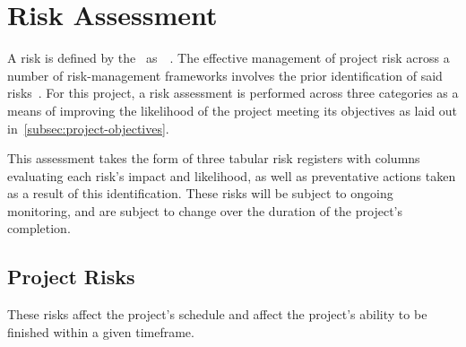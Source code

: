 
\thispagestyle{plain}
\newpage
\section{Risk Assessment}\label{sec:risk-assessment}

\normalsize

A risk is defined by the~\citet{pmi_2021} as~~\citep{pmi_2021}.
The effective management of project risk across a number of risk-management frameworks involves the prior identification of said risks~\citep{goman_risk}.
For this project, a risk assessment is performed across three categories as a means of improving the likelihood of the project meeting its objectives as laid out in~\ref{subsec:project-objectives}.

This assessment takes the form of three tabular risk registers with columns evaluating each risk's impact and likelihood, as well as preventative actions taken as a result of this identification.
These risks will be subject to ongoing monitoring, and are subject to change over the duration of the project's completion.

\subsection{Project Risks}\label{subsec:project-risks}

These risks affect the project’s schedule and affect the project’s ability to be finished within a given timeframe.

